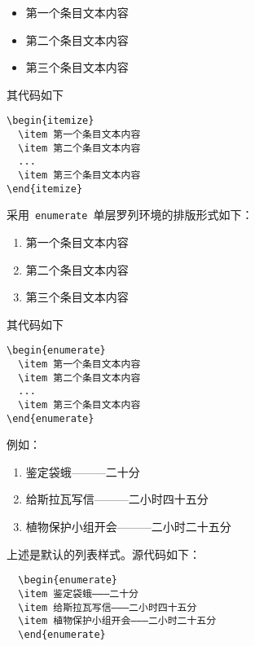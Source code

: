 \begin{itemize}
  \item 第一个条目文本内容
  \item 第二个条目文本内容
  \item 第三个条目文本内容
\end{itemize}

其代码如下
\begin{verbatim}
\begin{itemize}
  \item 第一个条目文本内容
  \item 第二个条目文本内容
  ...
  \item 第三个条目文本内容
\end{itemize}
\end{verbatim}

采用~\verb|enumerate|~单层罗列环境的排版形式如下：
\begin{enumerate}
  \item 第一个条目文本内容
  \item 第二个条目文本内容
  \item 第三个条目文本内容
\end{enumerate}

其代码如下
\begin{verbatim}
\begin{enumerate}
  \item 第一个条目文本内容
  \item 第二个条目文本内容
  ...
  \item 第三个条目文本内容
\end{enumerate}
\end{verbatim}

例如：

\begin{enumerate}
  \item 鉴定袋蛾———二十分
  \item 给斯拉瓦写信———二小时四十五分
  \item 植物保护小组开会———二小时二十五分
\end{enumerate}

上述是默认的列表样式。源代码如下：
\begin{lstlisting}
  \begin{enumerate}
  \item 鉴定袋蛾———二十分
  \item 给斯拉瓦写信———二小时四十五分
  \item 植物保护小组开会———二小时二十五分
  \end{enumerate}
\end{lstlisting}

